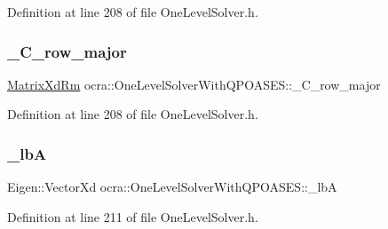 Definition at line 208 of file One\+Level\+Solver.\+h.

\hypertarget{classocra_1_1OneLevelSolverWithQPOASES_a5ad3c2a2670e8d7862735fefe2df6553}{}\label{classocra_1_1OneLevelSolverWithQPOASES_a5ad3c2a2670e8d7862735fefe2df6553} 
\subsubsection{\texorpdfstring{\+\_\+\+C\+\_\+row\+\_\+major}{\_C\_row\_major}}
{\footnotesize\ttfamily \hyperlink{group__solver_ga70eb87299c2fc1db3c4aac05df67d889}{Matrix\+Xd\+Rm} ocra\+::\+One\+Level\+Solver\+With\+Q\+P\+O\+A\+S\+E\+S\+::\+\_\+\+C\+\_\+row\+\_\+major\hspace{0.3cm}{\ttfamily [protected]}}



Definition at line 208 of file One\+Level\+Solver.\+h.

\hypertarget{classocra_1_1OneLevelSolverWithQPOASES_a3004e673e3f883cfba0b53f0a078ccd4}{}\label{classocra_1_1OneLevelSolverWithQPOASES_a3004e673e3f883cfba0b53f0a078ccd4} 
\subsubsection{\texorpdfstring{\+\_\+lbA}{\_lbA}}
{\footnotesize\ttfamily Eigen\+::\+Vector\+Xd ocra\+::\+One\+Level\+Solver\+With\+Q\+P\+O\+A\+S\+E\+S\+::\+\_\+lbA\hspace{0.3cm}{\ttfamily [protected]}}



Definition at line 211 of file One\+Level\+Solver.\+h.

\hypertarget{classocra_1_1OneLevelSolverWithQPOASES_ad7277d89275d722da93143ea58888579}{}\label{classocra_1_1OneLevelSolverWithQPOASES_ad7277d89275d722da93143ea58888579} 
